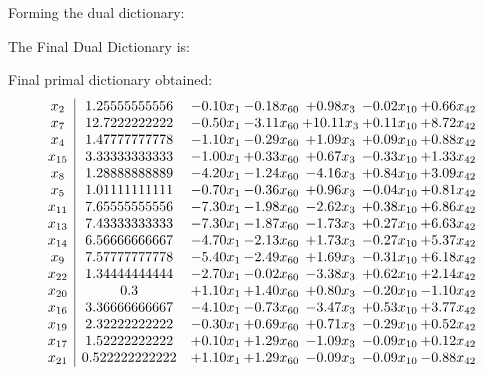 \documentclass[8pt]{article}
\begin{document}
Forming the dual dictionary:

The Final Dual Dictionary is: 

 Final primal dictionary obtained: 
\[\begin{array}{c| c c@{\hskip 2pt} c@{\hskip 2pt} c@{\hskip 2pt} c@{\hskip 2pt} c@{\hskip 2pt} }
 x_{2}   &  1.25555555556 & -0.10 x_{1} & -0.18 x_{60} & +  0.98 x_{3} & -0.02 x_{10} & +  0.66 x_{42}\\
 x_{7}   &  12.7222222222 & -0.50 x_{1} & -3.11 x_{60} & + 10.11 x_{3} & +  0.11 x_{10} & +  8.72 x_{42}\\
 x_{4}   &  1.47777777778 & -1.10 x_{1} & -0.29 x_{60} & +  1.09 x_{3} & +  0.09 x_{10} & +  0.88 x_{42}\\
 x_{15}   &  3.33333333333 & -1.00 x_{1} & +  0.33 x_{60} & +  0.67 x_{3} & -0.33 x_{10} & +  1.33 x_{42}\\
 x_{8}   &  1.28888888889 & -4.20 x_{1} & -1.24 x_{60} & -4.16 x_{3} & +  0.84 x_{10} & +  3.09 x_{42}\\
 x_{5}   &  1.01111111111 & -0.70 x_{1} & -0.36 x_{60} & +  0.96 x_{3} & -0.04 x_{10} & +  0.81 x_{42}\\
 x_{11}   &  7.65555555556 & -7.30 x_{1} & -1.98 x_{60} & -2.62 x_{3} & +  0.38 x_{10} & +  6.86 x_{42}\\
 x_{13}   &  7.43333333333 & -7.30 x_{1} & -1.87 x_{60} & -1.73 x_{3} & +  0.27 x_{10} & +  6.63 x_{42}\\
 x_{14}   &  6.56666666667 & -4.70 x_{1} & -2.13 x_{60} & +  1.73 x_{3} & -0.27 x_{10} & +  5.37 x_{42}\\
 x_{9}   &  7.57777777778 & -5.40 x_{1} & -2.49 x_{60} & +  1.69 x_{3} & -0.31 x_{10} & +  6.18 x_{42}\\
 x_{22}   &  1.34444444444 & -2.70 x_{1} & -0.02 x_{60} & -3.38 x_{3} & +  0.62 x_{10} & +  2.14 x_{42}\\
 x_{20}   &  0.3 & +  1.10 x_{1} & +  1.40 x_{60} & +  0.80 x_{3} & -0.20 x_{10} & -1.10 x_{42}\\
 x_{16}   &  3.36666666667 & -4.10 x_{1} & -0.73 x_{60} & -3.47 x_{3} & +  0.53 x_{10} & +  3.77 x_{42}\\
 x_{19}   &  2.32222222222 & -0.30 x_{1} & +  0.69 x_{60} & +  0.71 x_{3} & -0.29 x_{10} & +  0.52 x_{42}\\
 x_{17}   &  1.52222222222 & +  0.10 x_{1} & +  1.29 x_{60} & -1.09 x_{3} & -0.09 x_{10} & +  0.12 x_{42}\\
 x_{21}   &  0.522222222222 & +  1.10 x_{1} & +  1.29 x_{60} & -0.09 x_{3} & -0.09 x_{10} & -0.88 x_{42}\\

\end{array}\]
\end{document}
